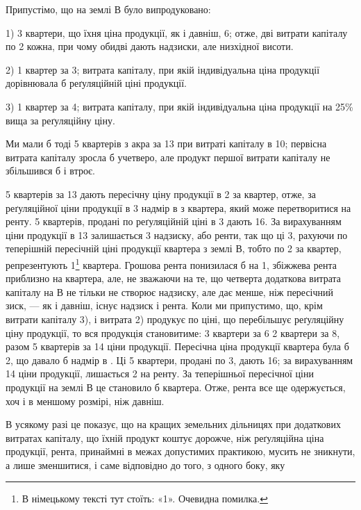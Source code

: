 Припустімо, що на землі $В$ було випродуковано:

1) 3 квартери, що їхня ціна продукції, як і давніш, 6; отже,
дві витрати капіталу по  2 кожна, при чому обидві дають надзиски,
але низхідної висоти.

2) 1 квартер за 3; витрата капіталу, при якій індивідуальна
ціна продукції дорівнювала б реґуляційній ціні продукції.

3) 1 квартер за 4; витрата капіталу, при якій індивідуальна
ціна продукції на 25\% вища за реґуляційну ціну.

Ми мали б тоді 5 квартерів з акра за 13 при витраті капіталу
в 10; первісна витрата капіталу зросла б учетверо, але продукт
першої витрати капіталу не збільшився б і втроє.

5 квартерів за 13 дають пересічну ціну продукції в 2
за квартер, отже, за реґуляційної ціни продукції в 3 надмір
в  з квартера, який може перетворитися на ренту.
5 квартерів, продані по реґуляційній ціні в 3 дають
16. За вирахуванням
ціни продукції в 13 залишається 3 надзиску, або
ренти, так що ці 3, рахуючи по теперішній пересічній ціні
продукції квартера з землі $В$, тобто по 2 за квартер,
репрезентують 1\footnote*{
В німецькому тексті тут стоїть: «1». Очевидна помилка. 
} квартера. Грошова рента понизилася б на 1, збіжжева
рента приблизно на  квартера, але, не зважаючи на те, що четверта додаткова
витрата капіталу на $В$ не тільки не створює надзиску, але дає менше, ніж
пересічний зиск, — як і давніш, існує надзиск і рента. Коли ми припустимо, що,
крім витрати капіталу 3), і витрата 2) продукує по ціні, що перебільшує реґуляційну
ціну продукції, то вся продукція становитиме: 3 квартери за
6 \dplus{} 2 квартери за 8, разом 5 квартерів за 14
ціни продукції. Пересічна ціна продукції квартера була б 2,
що давало б надмір в . Ці 5  квартери, продані по
3, дають 16; за вирахуванням
14 ціни продукції, лишається 2 на ренту. За теперішньої
пересічної ціни продукції на землі $В$ це становило б  квартера.
Отже, рента все ще одержується, хоч і в меншому розмірі, ніж давніш.

В усякому разі це показує, що на кращих земельних дільницях при додаткових
витратах капіталу, що їхній продукт коштує дорожче, ніж реґуляційна
ціна продукції, рента, принаймні в межах допустимих практикою, мусить не
зникнути, а лише зменшитися, і саме відповідно до того, з одного боку, яку
\parbreak{}  %
